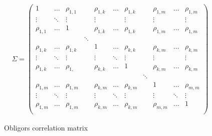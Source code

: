 \documentclass[a4paper,12pt,final]{article}
\begin{document}
\begin{figure}[!hb]
\begin{displaymath}
\begin{array}{c}
\Sigma=
\left(
\begin{array}{ccccccccccc}
1           & \dots    & \rho_{1,1}  &          & \rho_{1,k}  & \dots   & \rho_{1,k}  &         & \rho_{1,m}  & \dots      & \rho_{1,m}  \\
\vdots      & \ddots   & \vdots      &          & \vdots      &         & \vdots      &         & \vdots      &            & \vdots      \\
\rho_{1,1}  & \dots    & 1           &          & \rho_{1,k}  & \dots   & \rho_{1,k}  &         & \rho_{1,m}  & \dots      & \rho_{1,m}  \\

            &          &             & \ddots   &             &         &             &         &             &            &             \\

\rho_{1,k}  & \dots    & \rho_{1,k}  &          & 1           & \dots   & \rho_{k,k}  &         & \rho_{k,m}  & \dots      & \rho_{k,m}  \\
\vdots      & \ddots   & \vdots      &          & \vdots      & \ddots  & \vdots      &         & \vdots      &            & \vdots      \\
\rho_{1,k}  & \dots    & \rho_{1, }  &          & \rho_{k,k}  & \dots   & 1           &         & \rho_{k,m}  & \dots      & \rho_{k,m}  \\

            &          &             &          &             &         &             & \ddots  &             &            &             \\

\rho_{1,m}  & \dots    & \rho_{1,m}  &          & \rho_{k,m}  & \dots   & \rho_{k,m}  &         & 1           & \dots      & \rho_{m,m}  \\
\vdots      & \ddots   & \vdots      &          & \vdots      & \ddots  & \vdots      &         & \vdots      & \ddots     & \vdots      \\
\rho_{1,m}  & \dots    & \rho_{1,m}  &          & \rho_{k,m}  & \dots   & \rho_{k,m}  &         & \rho_{m,m}  & \dots      & 1           \\
\end{array}
\right)
\end{array}
\end{displaymath}
\caption{Obligors correlation matrix}
\label{obligorcorrel}
\end{figure}
\end{document}

